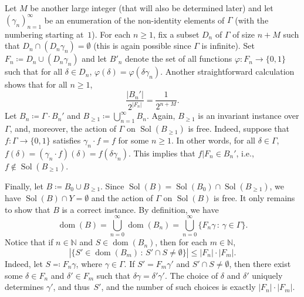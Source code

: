 \documentclass[12pt]{amsart}
\theoremstyle{definition}
\theoremstyle{remark}
\newcommand{\0}{\emptyset}
\newcommand{\set}[1]{\{#1\}}
\newcommand{\dom}{\operatorname{dom}}
\newcommand{\N}{\mathbb{N}}
\renewcommand{\phi}{\varphi}
\numberwithin{equation}{section}
\begin{document}
	Let $M$ be another large integer (that will also be determined later) and let $(\gamma_n)_{n=1}^\infty$ be an enumeration of the non-identity elements of $\Gamma$ (with the numbering starting at~$1$). For each $n \geq 1$, fix a subset $D_n$ of $\Gamma$ of size $n+M$ such that $D_n \cap (D_n\gamma_n) = \0$ (this is again possible since $\Gamma$ is infinite). Set $F_n \coloneqq D_n \cup (D_n \gamma_n)$ and let ${B}'_n$ denote the set of all functions $\phi \colon F_n \to \set{0, 1}$ such that for all $\delta \in D_n$, $\phi(\delta) = \phi(\delta\gamma_n)$. Another straightforward calculation shows that for all $n \geq 1$,
	\begin{equation}\label{eq:one_bound}
		\frac{|B_n'|}{2^{|F_n|}} = \frac{1}{2^{n+M}}.
	\end{equation}
	Let ${B}_n \coloneqq \Gamma \cdot {B}_n'$ and ${B}_{\geq 1} \coloneqq \bigcup_{n=1}^\infty {B}_n$. Again, ${B}_{\geq 1}$ is an invariant instance over $\Gamma$, and, moreover, the action of $\Gamma$ on $\operatorname{Sol}(B_{\geq 1})$ is free. Indeed, suppose that $f \colon \Gamma \to \set{0,1}$ satisfies $\gamma_n \cdot f = f$ for some $n \geq 1$. In other words, for all $\delta \in \Gamma$, $f(\delta) = (\gamma_n \cdot f)(\delta) = f(\delta \gamma_n)$. This implies that $f \vert F_n \in {B}_n'$, i.e., $f \not \in \operatorname{Sol}({B}_{\geq 1})$.
	
	Finally, let $B \coloneqq B_0 \cup B_{\geq 1}$. Since $\operatorname{Sol}(B) = \operatorname{Sol}(B_0) \cap \operatorname{Sol}(B_{\geq 1})$, we have $\operatorname{Sol}(B) \cap Y = \0$ and the action of $\Gamma$ on $\operatorname{Sol}(B)$ is free. It only remains to show that $B$ is a correct instance. By definition, we have
	$$
		\dom(B) = \bigcup_{n=0}^\infty \dom(B_n) = \bigcup_{n=0}^\infty\set{F_n \gamma \,:\, \gamma \in \Gamma}.
	$$
	Notice that if $n \in \N$ and $S \in \dom(B_n)$, then for each $m \in \N$,
	\begin{equation}\label{eq:degree_bound}
		|\set{S' \in \dom(B_m)\,:\, S' \cap S \neq \0}| \leq |F_n|\cdot |F_m|.
	\end{equation}
	Indeed, let $S \eqqcolon F_n \gamma$, where $\gamma \in \Gamma$. If $S' = F_m\gamma'$ and $S' \cap S \neq \0$, then there exist some $\delta \in F_n$ and $\delta' \in F_m$ such that $\delta \gamma = \delta' \gamma'$. The choice of $\delta$ and $\delta'$ uniquely determines $\gamma'$, and thus~$S'$, and the number of such choices is exactly $|F_n| \cdot |F_m|$.
	
\end{document}
